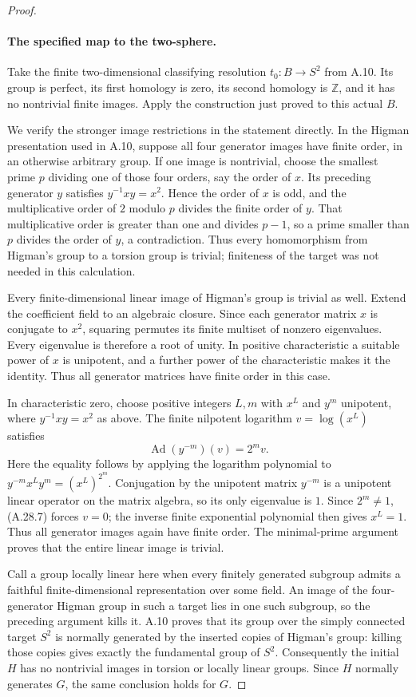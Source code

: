 \begin{proof}
\paragraph{The specified map to the two-sphere.}
Take the finite two-dimensional classifying
resolution $t_0:B\to S^2$ from A.10. Its group
is perfect, its first homology is zero, its
second homology is $\mathbb Z$, and it has no
nontrivial finite images. Apply the construction
just proved to this actual $B$.

We verify the stronger image restrictions in the
statement directly. In the Higman presentation used
in A.10, suppose all four generator images have
finite order, in an otherwise arbitrary group.
If one image is nontrivial, choose the smallest
prime $p$ dividing one of those four orders, say
the order of $x$. Its preceding generator $y$
satisfies $y^{-1}xy=x^2$. Hence the order of $x$
is odd, and the multiplicative order of $2$ modulo
$p$ divides the finite order of $y$. That
multiplicative order is greater than one and
divides $p-1$, so a prime smaller than $p$ divides
the order of $y$, a contradiction. Thus every
homomorphism from Higman's group to a torsion
group is trivial; finiteness of the target was
not needed in this calculation.

Every finite-dimensional linear image of Higman's
group is trivial as well. Extend the coefficient
field to an algebraic closure. Since each generator
matrix $x$ is conjugate to $x^2$, squaring permutes
its finite multiset of nonzero eigenvalues. Every
eigenvalue is therefore a root of unity. In positive
characteristic a suitable power of $x$ is unipotent,
and a further power of the characteristic makes
it the identity. Thus all generator matrices have
finite order in this case.

In characteristic zero, choose positive integers
$L,m$ with $x^L$ and $y^m$ unipotent, where
$y^{-1}xy=x^2$ as above. The finite nilpotent
logarithm $v=\log(x^L)$ satisfies
\[
 \operatorname{Ad}(y^{-m})(v)=2^m v.
 \tag{A.28.7}
\]
Here the equality follows by applying the logarithm
polynomial to
$y^{-m}x^Ly^m=(x^L)^{2^m}$. Conjugation by the
unipotent matrix $y^{-m}$ is a unipotent linear
operator on the matrix algebra, so its only
eigenvalue is $1$. Since $2^m\ne1$, (A.28.7)
forces $v=0$; the inverse finite exponential
polynomial then gives $x^L=1$. Thus all generator
images again have finite order. The minimal-prime
argument proves that the entire linear image
is trivial.

Call a group locally linear here when every
finitely generated subgroup admits a faithful
finite-dimensional representation over some
field. An image of the four-generator Higman
group in such a target lies in one such subgroup,
so the preceding argument kills it. A.10 proves
that its group over the simply connected target
$S^2$ is normally generated by the inserted
copies of Higman's group: killing those copies
gives exactly the fundamental group of $S^2$.
Consequently the initial $H$ has no nontrivial
images in torsion or locally linear groups.
Since $H$ normally generates $G$, the same
conclusion holds for $G$.


\end{proof}

